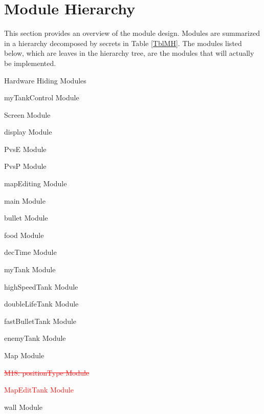 \documentclass[12pt, titlepage]{article}
\newcounter{mnum}
\newcommand{\mthemnum}{M\themnum}
\begin{document}
\section{Module Hierarchy} \label{SecMH}

This section provides an overview of the module design. Modules are summarized
in a hierarchy decomposed by secrets in Table \ref{TblMH}. The modules listed
below, which are leaves in the hierarchy tree, are the modules that will
actually be implemented.

\begin{description}
\item [ \mthemnum \label{M1}:] Hardware Hiding Modules
\item [ \mthemnum \label{M2}:] myTankControl Module
\item [ \mthemnum \label{M3}:] Screen Module
\item [ \mthemnum \label{M4}:] display Module
\item [ \mthemnum \label{M5}:] PvsE Module
\item [ \mthemnum \label{M6}:] PvsP Module
\item [ \mthemnum \label{M7}:] mapEditing Module
\item [ \mthemnum \label{M8}:] main Module

\item [ \mthemnum \label{M9}:] bullet Module
\item [ \mthemnum \label{M10}:] food Module
\item [ \mthemnum \label{M11}:] decTime Module
\item [ \mthemnum \label{M12}:] myTank Module
\item [ \mthemnum \label{M13}:] highSpeedTank Module
\item [ \mthemnum \label{M14}:] doubleLifeTank Module
\item [ \mthemnum \label{M15}:] fastBulletTank Module
\item [ \mthemnum \label{M16}:] enemyTank Module
\item [ \mthemnum \label{M17}:] Map Module
\item \textcolor{red}{\sout{{M18}: positionType Module}}
\item [\textcolor{red}{\refstepcounter{mnum} \mthemnum \label{M18}:}] \textcolor{red}{MapEditTank Module}
\item [\refstepcounter{mnum} \mthemnum \label{M19}:] wall Module
\end{description}
\end{document}
